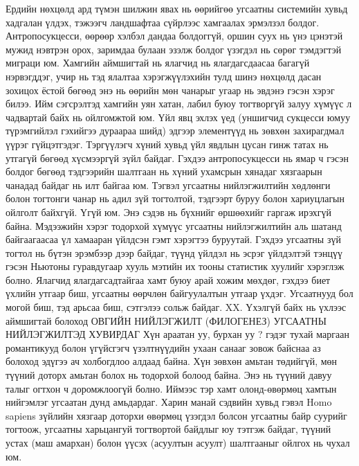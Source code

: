 Ердийн нөхцөлд ард түмэн шилжин явах нь өөрийгөө угсаатны системийн хувьд хадгалан үлдэх, тэжээгч ландшафтаа сүйрлээс хамгаалах эрмэлзэл болдог. Антропосукцесси, өөрөөр хэлбэл дандаа болдоггүй, оршин суух нь үнэ цэнэтэй мужид нэвтрэн орох, заримдаа булаан эзэлж болдог үзэгдэл нь сөрөг тэмдэгтэй миграци юм. Хамгийн аймшигтай нь ялагчид нь ялагдагсдаасаа багагүй нэрвэгддэг, учир нь тэд ялалтаа хэрэгжүүлэхийн тулд шинэ нөхцөлд дасан зохицох ёстой бөгөөд энэ нь өөрийн мөн чанарыг угаар нь эвдэнэ гэсэн хэрэг билээ. Ийм сэгсрэлтэд хамгийн уян хатан, лабил буюу тогтворгүй залуу хүмүүс л чадвартай байх нь ойлгомжтой юм.
Үйл явц эхлэх үед (уншигчид сукцесси юмуу түрэмгийлэл гэхийгээ дураараа шийд) эдгээр элементүүд нь зөвхөн захирагдмал үүрэг гүйцэтгэдэг. Тэргүүлэгч хүний хувьд үйл явдлын цусан гинж татах нь утгагүй бөгөөд хүсмээргүй зүйл байдаг. Гэхдээ антропосукцесси нь ямар ч гэсэн болдог бөгөөд тэдгээрийн шалтгаан нь хүний ухамсрын хянадаг хязгаарын чанадад байдаг нь илт байгаа юм. Тэгвэл угсаатны нийлэгжилтийн хөдлөнги болон тогтонги чанар нь адил зүй тогтолтой, тэдгээрт буруу болон хариуцлагын ойлголт байхгүй. Үгүй юм. Энэ сэдэв нь бүхнийг өршөөхийг гаргаж ирэхгүй байна. Мэдээжийн хэрэг тодорхой хүмүүс угсаатны нийлэгжилтийн аль шатанд байгаагаасаа үл хамааран үйлдсэн гэмт хэрэгтээ буруутай. Гэхдээ угсаатны зүй тогтол нь бүтэн эрэмбээр дээр байдаг, түүнд үйлдэл нь эсрэг үйлдэлтэй тэнцүү гэсэн Ньютоны гуравдугаар хууль мэтийн их тооны статистик хуулийг хэрэглэж болно. Ялагчид ялагдагсадтайгаа хамт буюу арай хожим мөхдөг, гэхдээ биет үхлийн утгаар биш, угсаатны өөрчлөн байгуулалтын утгаар үхдэг. Угсаатнууд бол могой биш, тэд арьсаа биш, сэтгэлээ сольж байдаг.
XX. Үхэлгүй байх нь үхлээс аймшигтай болоход
ОВГИЙН НИЙЛЭГЖИЛТ (ФИЛОГЕНЕЗ) УГСААТНЫ НИЙЛЭГЖИЛТЭД ХУВИРДАГ
Хүн араатан уу, бурхан уу ? гэдэг тухай маргаан романтикууд болон үгүйсгэгч үзэлтнүүдийн ухаан санааг зовож байснаа аз болоход эдүгээ ач холбогдлоо алдаад байна. Хүн зөвхөн амьтан төдийгүй, мөн түүний доторх амьтан болох нь тодорхой болоод байна. Энэ нь түүний давуу талыг огтхон ч доромжлоогүй болно. Иймээс тэр хамт олонд-өвөрмөц хамтын нийгэмлэг угсаатан дунд амьдардаг. Харин манай сэдвийн хувьд гэвэл Homo sapiens зүйлийн хязгаар доторхи өвөрмөц үзэгдэл болсон угсаатны байр суурийг тогтоож, угсаатны харьцангуй тогтвортой байдлыг юу тэтгэж байдаг, түүний устах (маш амархан) болон үүсэх (асуултын асуулт) шалтгааныг ойлгох нь чухал юм.
